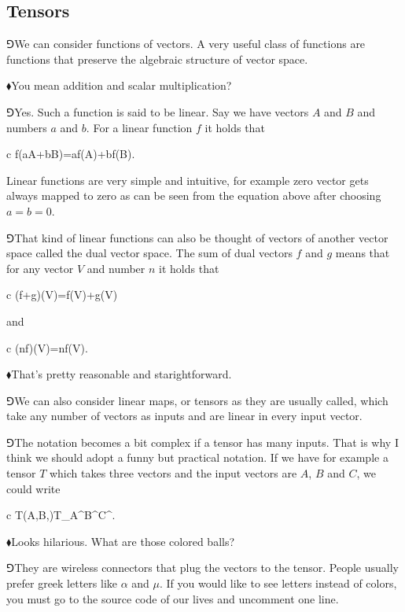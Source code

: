 \documentclass[10pt,oneside%
]{memoir}
\newenvironment{eqna}{\begin{IEEEeqnarray*}{c}}{\end{IEEEeqnarray*}\ignorespacesafterend}
\newcommand{\tensa}[2]{#1_{#2}}
\newcommand{\coa}{{\color{black}\bullet}}
\newcommand{\cob}{{\color{oranssi}\bullet}}
\newcommand{\coc}{{\color{cyan}\bullet}}
\newcommand{\hea}{\(\blacklozenge\)\;}
\newcommand{\heb}{\(\Game\)\;}
\begin{document}
\subsection{Tensors}
\heb We can consider functions of vectors. A very useful class of functions are functions that preserve the algebraic structure of vector space.

\hea You mean addition and scalar multiplication? 

\heb Yes. Such a function is said to be linear. Say we have vectors \(A\) and \(B\) and numbers \(a\) and \(b\). For a linear function \(f\) it holds that
\begin{eqna}
    f(aA+bB)=af(A)+bf(B).
\end{eqna}
Linear functions are very simple and intuitive, for example zero vector gets always mapped to zero as can be seen from the equation above after choosing \(a=b=0\).

\heb That kind of linear functions can also be thought of vectors of another vector space called the dual vector space. The sum of dual vectors \(f\) and \(g\) means that for any vector \(V\) and number \(n\) it holds that
\begin{eqna}
    (f+g)(V)=f(V)+g(V)
\end{eqna}
and
\begin{eqna}
    (nf)(V)=nf(V).
\end{eqna}

\hea That's pretty reasonable and starightforward.

\heb We can also consider linear maps, or tensors as they are usually called, which take any number of vectors as inputs and are linear in every input vector.

\heb The notation becomes a bit complex if a tensor has many inputs. That is why I think we should adopt a funny but practical notation. If we have for example a tensor \(T\) which takes three vectors and the input vectors are \(A\), \(B\) and \(C\), we could write
\begin{eqna}
    T(A,B,)\doteq\tensa{T}{\coa\cob\coc}A^\coa B^\cob C^\coc.
\end{eqna}

\hea Looks hilarious. What are those colored balls?

\heb They are wireless connectors that plug the vectors to the tensor. People usually prefer greek letters like \(\alpha\) and \(\mu\). If you would like to see letters instead of colors, you must go to the source code of our lives and uncomment one line.
\end{document}
